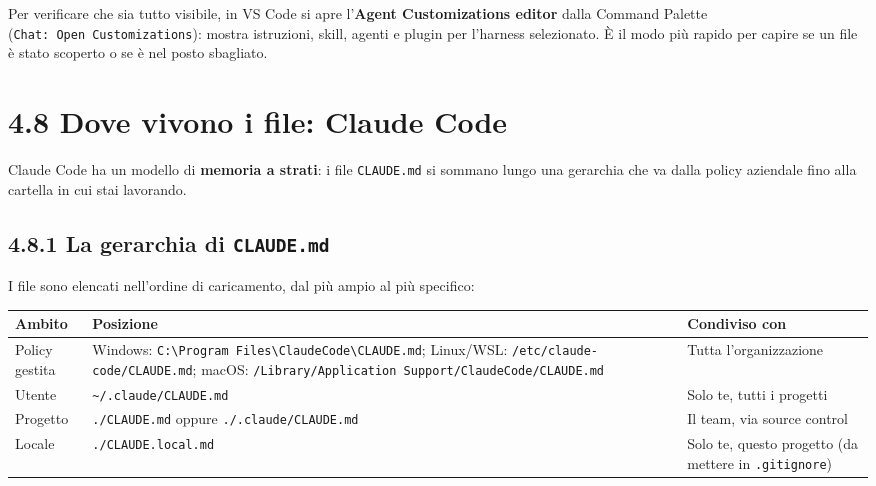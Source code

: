 \documentclass[
  italian,
  10pt,
]{book}
\newcounter{none} %
\begin{document}
Per verificare che sia tutto visibile, in VS Code si apre
l'\textbf{Agent Customizations editor} dalla Command Palette
(\texttt{Chat:\ Open\ Customizations}): mostra istruzioni, skill, agenti
e plugin per l'harness selezionato. È il modo più rapido per capire se
un file è stato scoperto o se è nel posto sbagliato.

\section{4.8 Dove vivono i file: Claude
Code}\label{dove-vivono-i-file-claude-code}

Claude Code ha un modello di \textbf{memoria a strati}: i file
\texttt{CLAUDE.md} si sommano lungo una gerarchia che va dalla policy
aziendale fino alla cartella in cui stai lavorando.

\subsection{\texorpdfstring{4.8.1 La gerarchia di
\texttt{CLAUDE.md}}{4.8.1 La gerarchia di CLAUDE.md}}\label{la-gerarchia-di-claude.md}

I file sono elencati nell'ordine di caricamento, dal più ampio al più
specifico:

\footnotesize

{\def\LTcaptype{none} %
\begin{longtable}[]{@{}
  >{\raggedright\arraybackslash}p{}
  >{\raggedright\arraybackslash}p{}
  >{\raggedright\arraybackslash}p{}@{}}
\toprule\noalign{}
\begin{minipage}[b]{\linewidth}\raggedright
Ambito
\end{minipage} & \begin{minipage}[b]{\linewidth}\raggedright
Posizione
\end{minipage} & \begin{minipage}[b]{\linewidth}\raggedright
Condiviso con
\end{minipage} \\
\midrule\noalign{}
\endhead
\bottomrule\noalign{}
\endlastfoot
Policy gestita & Windows:
\texttt{C:\textbackslash{}Program\ Files\allowbreak\textbackslash{}ClaudeCode\allowbreak\textbackslash{}CLAUDE.md};
Linux/WSL: \texttt{/etc/claude-code\allowbreak/CLAUDE.md}; macOS:
\texttt{/Library\allowbreak/Application\ Support\allowbreak/ClaudeCode\allowbreak/CLAUDE.md}
& Tutta l'organizzazione \\
Utente & \texttt{\textasciitilde{}/.claude/CLAUDE.md} & Solo te, tutti i
progetti \\
Progetto & \texttt{./CLAUDE.md} oppure \texttt{./.claude/CLAUDE.md} & Il
team, via source control \\
Locale & \texttt{./CLAUDE.local.md} & Solo te, questo progetto (da
mettere in \texttt{.gitignore}) \\
\end{longtable}
}
\end{document}

